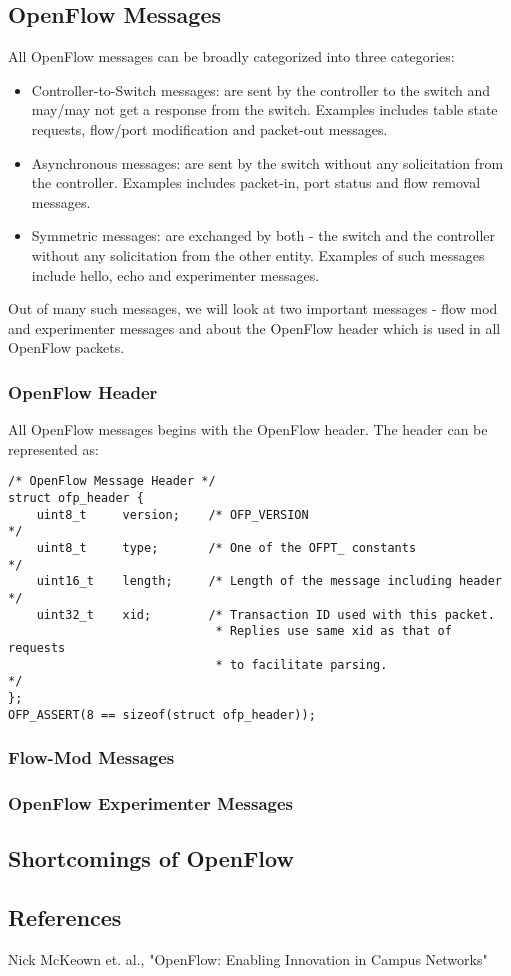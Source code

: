 \documentclass[a4paper]{article}
\begin{document}
\subsection{OpenFlow Messages}
All OpenFlow messages can be broadly categorized into three categories:
\begin{itemize}
\item Controller-to-Switch messages: are sent by the controller to the switch and may/may not get a response from the switch. Examples includes table state requests, flow/port modification and packet-out messages.
\item Asynchronous messages: are sent by the switch without any solicitation from the controller. Examples includes packet-in, port status and flow removal messages.
\item Symmetric messages: are exchanged by both - the switch and the controller without any solicitation from the other entity. Examples of such messages include hello, echo and experimenter messages.
\end{itemize}


Out of many such messages, we will look at two important messages - flow mod and experimenter messages and about the OpenFlow header which is used in all OpenFlow packets.

\subsubsection {OpenFlow Header}
All OpenFlow messages begins with the OpenFlow header. The header can be represented as:

\begin{verbatim}
/* OpenFlow Message Header */
struct ofp_header {
    uint8_t     version;    /* OFP_VERSION                              */
    uint8_t     type;       /* One of the OFPT_ constants               */
    uint16_t    length;     /* Length of the message including header   */
    uint32_t    xid;        /* Transaction ID used with this packet.    
                             * Replies use same xid as that of requests
                             * to facilitate parsing.                   */
};
OFP_ASSERT(8 == sizeof(struct ofp_header));
\end{verbatim}

\subsubsection{Flow-Mod Messages}
\subsubsection{OpenFlow Experimenter Messages}

\subsection{Shortcomings of OpenFlow}

\subsection{References}
\begin{thebibliography}[9]
Nick McKeown et. al.,
"OpenFlow: Enabling Innovation in Campus Networks"
\end{thebibliography}
\end{document}
